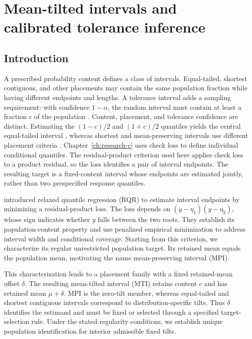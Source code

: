 \chapter{Mean-tilted intervals and calibrated tolerance inference}
\label{ch:research-d}

\section{Introduction}
\label{rqr2026:sec:introduction}

A prescribed probability content defines a class of intervals. Equal-tailed,
shortest contiguous, and other placements may contain the same population
fraction while having different endpoints and lengths. A tolerance interval
adds a sampling requirement: with
confidence \(1-\alpha\), the random interval must contain at least a fraction
\(c\) of the population
\citep{rqr-Wilks1941ToleranceLimits,rqr-Wilks1942StatisticalPrediction,rqr-Robbins1944DistributionFreeTolerance}.
Content, placement, and tolerance confidence are distinct. Estimating the
\((1-c)/2\) and \((1+c)/2\) quantiles yields the central equal-tailed interval
\citep{qdesn-KoenkerBassett1978}, whereas shortest and mean-preserving intervals use
different placement criteria
\citep{rqr-BrehmerGneiting2021Intervals,rqr-FisslerEtAl2021SetValued}.
Chapter~\ref{ch:research-c} uses check loss to define individual conditional
quantiles. The residual-product criterion used here applies check loss to a
product residual, so the loss identifies a pair of interval endpoints. The
resulting target is a fixed-content interval whose endpoints are estimated
jointly, rather than two prespecified response quantiles.

\citet{rqr-PouplinEtAl2024RQR} introduced relaxed quantile regression (RQR)
to estimate interval endpoints by minimizing a residual-product loss. The
loss depends on \((y-\eta_1)(y-\eta_2)\), whose sign indicates whether \(y\)
falls between the two roots. They establish its population-content property
and use penalized empirical minimization to address interval width and
conditional coverage. Starting from this criterion, we characterize its
regular unrestricted population target. Its retained mean equals the
population mean, motivating the name mean-preserving interval (MPI).

This characterization leads to a placement family with a fixed retained-mean offset
\(\delta\). The resulting mean-tilted interval (MTI) retains
content \(c\) and has retained mean \(\mu+\delta\). MPI is the zero-tilt member,
whereas equal-tailed and shortest contiguous intervals correspond to
distribution-specific tilts. Thus \(\delta\) identifies the estimand and must
be fixed or selected through a specified target-selection rule.
Under the stated regularity conditions, we establish unique population
identification for interior admissible fixed tilts.

